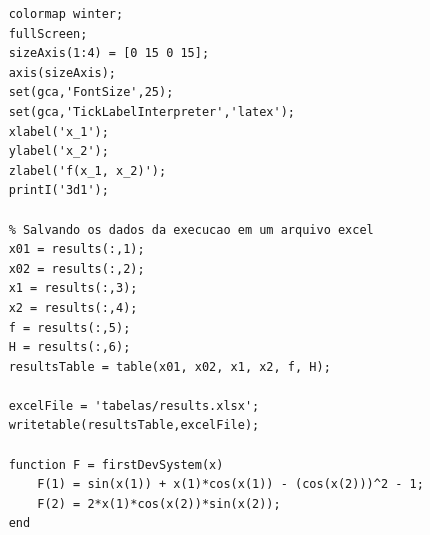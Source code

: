 \documentclass[12pt]{article}
\begin{document}
\begin{lstlisting}
	colormap winter;
	fullScreen;
	sizeAxis(1:4) = [0 15 0 15];
	axis(sizeAxis);
	set(gca,'FontSize',25);
	set(gca,'TickLabelInterpreter','latex');
	xlabel('x_1');
	ylabel('x_2');
	zlabel('f(x_1, x_2)');
	printI('3d1');
	
	% Salvando os dados da execucao em um arquivo excel
	x01 = results(:,1);
	x02 = results(:,2); 
	x1 = results(:,3);
	x2 = results(:,4);
	f = results(:,5);
	H = results(:,6);
	resultsTable = table(x01, x02, x1, x2, f, H);
	
	excelFile = 'tabelas/results.xlsx';
	writetable(resultsTable,excelFile);

	function F = firstDevSystem(x)
		F(1) = sin(x(1)) + x(1)*cos(x(1)) - (cos(x(2)))^2 - 1;
		F(2) = 2*x(1)*cos(x(2))*sin(x(2));
	end

	\end{lstlisting}
	
\end{document}
